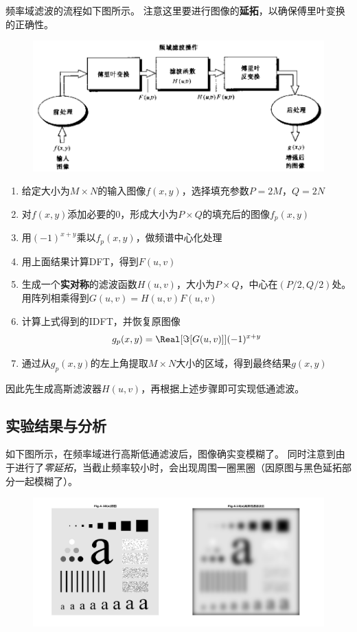 \documentclass[logo,reportComp]{thesis}
\begin{document}
频率域滤波的流程如下图所示。
注意这里要进行图像的\textbf{延拓}，以确保傅里叶变换的正确性。
\begin{figure}[H]
\centering
\includegraphics[width=0.8\linewidth]{fig/process.png}
\end{figure}
\begin{enumerate}
	\item 给定大小为$M\times N$的输入图像$f(x,y)$，选择填充参数$P=2M$，$Q=2N$
	\item 对$f(x,y)$添加必要的0，形成大小为$P\times Q$的填充后的图像$f_p(x,y)$
	\item 用$(-1)^{x+y}$乘以$f_p(x,y)$，做频谱中心化处理
	\item 用上面结果计算DFT，得到$F(u,v)$
	\item 生成一个\textbf{实对称}的滤波函数$H(u,v)$，大小为$P\times Q$，中心在$(P/2,Q/2)$处。
	用阵列相乘得到$G(u,v)=H(u,v)F(u,v)$
	\item 计算上式得到的IDFT，并恢复原图像
	\[g_p(x,y)=\Real[\Im[G(u,v)]](-1)^{x+y}\]
	\item 通过从$g_p(x,y)$的左上角提取$M\times N$大小的区域，得到最终结果$g(x,y)$
\end{enumerate}
因此先生成高斯滤波器$H(u,v)$，再根据上述步骤即可实现低通滤波。

\subsection{实验结果与分析}
如下图所示，在频率域进行高斯低通滤波后，图像确实变模糊了。
同时注意到由于进行了\emph{零延拓}，当截止频率较小时，会出现周围一圈黑圈（因原图与黑色延拓部分一起模糊了）。
\begin{figure}[H]
\centering
\includegraphics[width=0.8\linewidth]{fig/02.png}
\end{figure}
\end{document}

